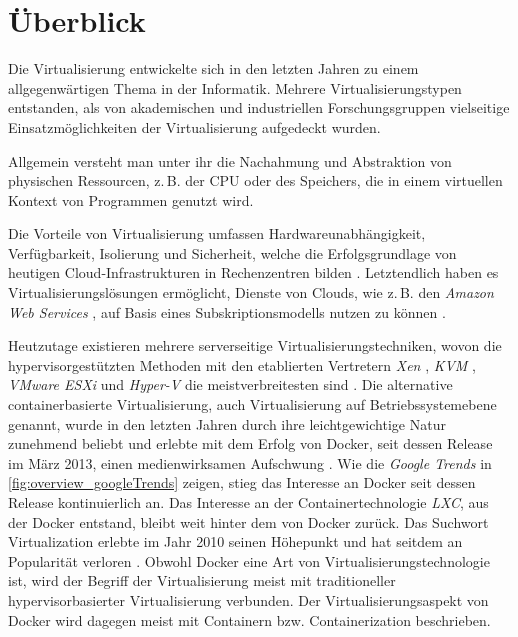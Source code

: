 \documentclass[../main.tex]{subfiles}
\begin{document}
\chapter{Überblick}
\label{overview}
  Die Virtualisierung entwickelte sich in den letzten Jahren zu einem allgegenwärtigen Thema in der Informatik. Mehrere Virtualisierungstypen entstanden, als von akademischen und industriellen Forschungsgruppen vielseitige Einsatzmöglichkeiten der Virtualisierung aufgedeckt wurden.

  Allgemein versteht man unter ihr die Nachahmung und Abstraktion von physischen Ressourcen, z.\,B. der \acrshort{CPU} oder des Speichers, die in einem virtuellen Kontext von Programmen genutzt wird.

  Die Vorteile von Virtualisierung umfassen Hardwareunabhängigkeit, Verfügbarkeit, Isolierung und Sicherheit, welche die Erfolgsgrundlage von heutigen \gls{Cloud}-Infrastrukturen in Rechenzentren bilden \cite[S.1]{containerVirtPerformance}.
  Letztendlich haben es Virtualisierungslösungen ermöglicht, Dienste von Clouds, wie z.\,B. den \emph{Amazon Web Services} \cite{amazonWebServices}, auf Basis eines Subskriptionsmodells nutzen zu können \cite[S.1]{dockerSec1}.

  Heutzutage existieren mehrere serverseitige Virtualisierungstechniken, wovon die hypervisorgestützten Methoden mit den etablierten Vertretern \emph{Xen} \cite{xen}, \emph{KVM} \cite{kvm}, \emph{VMware ESXi} \cite{vmwareESXi} und \emph{Hyper-V} \cite{hyperv} die meistverbreitesten sind \cite[S.2]{containerVirtPerformance}. Die alternative containerbasierte Virtualisierung, auch Virtualisierung auf Betriebssystemebene genannt, wurde in den letzten Jahren durch ihre leichtgewichtige Natur zunehmend beliebt und erlebte mit dem Erfolg von Docker, seit dessen Release im März 2013, einen medienwirksamen Aufschwung \cite{githubDockerChangelog}. Wie die \emph{Google Trends} in \fig \ref{fig:overview_googleTrends} zeigen, stieg das Interesse an Docker seit dessen Release kontinuierlich an. Das Interesse an der Containertechnologie \emph{\acrshort{LXC}}, aus der Docker entstand, bleibt weit hinter dem von Docker zurück. Das Suchwort \glqq{}Virtualization\grqq{} erlebte im Jahr 2010 seinen Höhepunkt und hat seitdem an Popularität verloren \cite{googleTrends}. Obwohl Docker eine Art von  Virtualisierungstechnologie ist, wird der Begriff der Virtualisierung meist mit traditioneller hypervisorbasierter Virtualisierung verbunden. Der Virtualisierungsaspekt von Docker wird dagegen meist mit Containern bzw. Containerization beschrieben.
\end{document}
